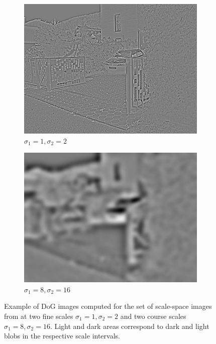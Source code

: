 \documentclass[thesis.tex]{subfiles}
\begin{document}
\begin{figure}[p]
	\centering
	\begin{subfigure}[t]{0.49\textwidth}
		\includegraphics[width=\textwidth]{img/scaleSpaceTheory_2-1.png}
		\caption{$\sigma_1 = 1, \sigma_2 = 2$}
		\label{fig:dogExampleFirst}
	\end{subfigure}
	\begin{subfigure}[t]{0.49\textwidth}
		\includegraphics[width=\textwidth]{img/scaleSpaceTheory_16-8.png}
		\caption{$\sigma_1 = 8, \sigma_2 = 16$}
		\label{fig:dogExampleLast}
	\end{subfigure}
	\caption{Example of DoG images computed for the set of scale-space images from  at two fine scales $\sigma_1 = 1, \sigma_2 = 2$ and two course scales $\sigma_1 = 8, \sigma_2 = 16$. Light and dark areas correspond to dark and light blobs in the respective scale intervals.}
	\label{fig:dogExample}
\end{figure}
\end{document}
